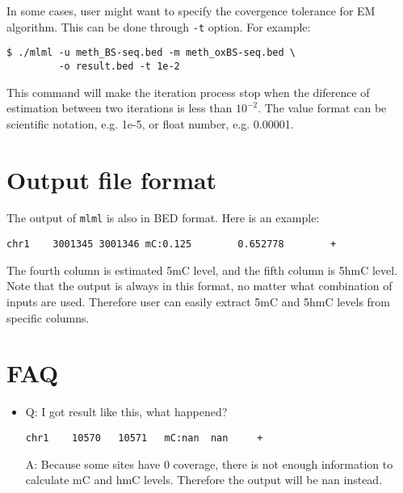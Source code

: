 \documentclass[11pt]{article}
\newcommand{\prog}[1]{\texttt{#1}}
\newcommand{\op}[1]{\texttt{#1}}
\begin{document}
In some cases, user might want to specify the covergence tolerance for EM algorithm. This can be done through \op{-t} option. For example:
\begin{verbatim}
$ ./mlml -u meth_BS-seq.bed -m meth_oxBS-seq.bed \
         -o result.bed -t 1e-2
\end{verbatim}
This command will make the iteration process stop when the diference of estimation between two iterations is less than $10^{-2}$. The value format can be scientific notation, e.g. 1e-5, or float number, e.g. 0.00001.

\section{Output file format}
The output of \prog{mlml} is also in BED format. Here is an example:
\begin{verbatim}
chr1    3001345 3001346 mC:0.125        0.652778        +
\end{verbatim}
The fourth column is estimated 5mC level, and the fifth column is 5hmC level. Note that the output is always in this format, no matter what combination of inputs are used. Therefore user can easily extract 5mC and 5hmC levels from specific columns.

\section{FAQ}
\begin{itemize}
\item Q: I got result like this, what happened?
\begin{verbatim}
chr1    10570   10571   mC:nan  nan     +
\end{verbatim}
A: Because some sites have 0 coverage, there is not enough information to calculate mC and hmC levels. Therefore the output will be nan instead.
\end{itemize}
\end{document}
